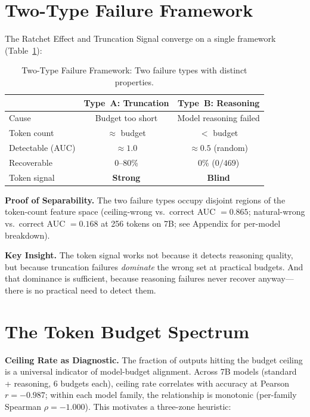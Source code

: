 \documentclass{article}
\begin{document}
\section{Two-Type Failure Framework}

The Ratchet Effect and Truncation Signal converge on a single framework (Table~\ref{tab:theory}):

\begin{table}[h]
\centering
\caption{Two-Type Failure Framework: Two failure types with distinct properties.}
\label{tab:theory}
\begin{tabular}{lcc}
\toprule
& \textbf{Type~A: Truncation} & \textbf{Type~B: Reasoning} \\
\midrule
Cause & Budget too short & Model reasoning failed \\
Token count & $\approx$ budget & $<$ budget \\
Detectable (AUC) & $\approx 1.0$ & $\approx 0.5$ (random) \\
Recoverable & 0--80\% & 0\% ($0/469$) \\
Token signal & \textbf{Strong} & \textbf{Blind} \\
\bottomrule
\end{tabular}
\end{table}

\textbf{Proof of Separability.}
The two failure types occupy disjoint regions of the token-count feature space (ceiling-wrong vs.\ correct AUC $= 0.865$; natural-wrong vs.\ correct AUC $= 0.168$ at 256 tokens on 7B; see Appendix for per-model breakdown).

\textbf{Key Insight.}
The token signal works not because it detects reasoning quality, but because truncation failures \emph{dominate} the wrong set at practical budgets. And that dominance is sufficient, because reasoning failures never recover anyway---there is no practical need to detect them.

\section{The Token Budget Spectrum}

\textbf{Ceiling Rate as Diagnostic.}
The fraction of outputs hitting the budget ceiling is a universal indicator of model-budget alignment. Across 7B models (standard + reasoning, 6 budgets each), ceiling rate correlates with accuracy at Pearson $r = -0.987$; within each model family, the relationship is monotonic (per-family Spearman $\rho = -1.000$). This motivates a three-zone heuristic:
\end{document}

